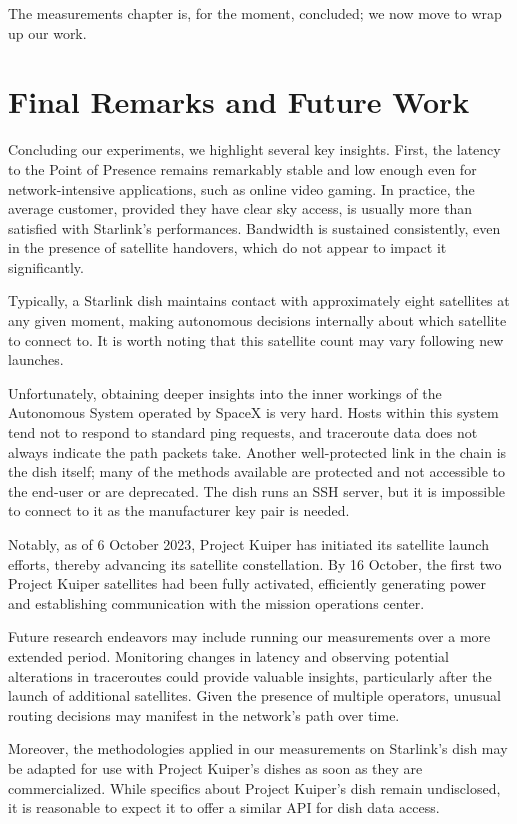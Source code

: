 \documentclass[IN,11pt,twoside,openright,idp,english]{tumthesis}
\begin{document}
The measurements chapter is, for the moment, concluded; we now move to wrap up our work.


\chapter{Final Remarks and Future Work}

Concluding our experiments, we highlight several key insights. First, the latency to the Point of Presence remains remarkably stable and low enough even for network-intensive applications, such as online video gaming. In practice, the average customer, provided they have clear sky access, is usually more than satisfied with Starlink's performances. Bandwidth is sustained consistently, even in the presence of satellite handovers, which do not appear to impact it significantly.

Typically, a Starlink dish maintains contact with approximately eight satellites at any given moment, making autonomous decisions internally about which satellite to connect to. It is worth noting that this satellite count may vary following new launches.

Unfortunately, obtaining deeper insights into the inner workings of the Autonomous System operated by SpaceX is very hard. Hosts within this system tend not to respond to standard ping requests, and traceroute data does not always indicate the path packets take. Another well-protected link in the chain is the dish itself; many of the methods available are protected and not accessible to the end-user or are deprecated. The dish runs an SSH server, but it is impossible to connect to it as the manufacturer key pair is needed.

Notably, as of 6 October 2023, Project Kuiper has initiated its satellite launch efforts, thereby advancing its satellite constellation. By 16 October, the first two Project Kuiper satellites had been fully activated, efficiently generating power and establishing communication with the mission operations center.

Future research endeavors may include running our measurements over a more extended period. Monitoring changes in latency and observing potential alterations in traceroutes could provide valuable insights, particularly after the launch of additional satellites. Given the presence of multiple operators, unusual routing decisions may manifest in the network's path over time.

Moreover, the methodologies applied in our measurements on Starlink's dish may be adapted for use with Project Kuiper's dishes as soon as they are commercialized. While specifics about Project Kuiper's dish remain undisclosed, it is reasonable to expect it to offer a similar API for dish data access.
\end{document}
